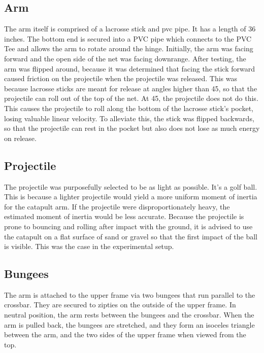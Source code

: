 \documentclass[10pt]{article}
\begin{document}
\begin{flushleft}
  \subsection{Arm}
    \par
    The arm itself is comprised of a lacrosse stick and pvc pipe.
    It has a length of 36 inches.
    The bottom end is secured into a PVC pipe which connects to the PVC Tee and allows the arm to rotate around the hinge.
    Initially, the arm was facing forward and the open side of the net was facing downrange.
    After testing, the arm was flipped around, because it was determined that facing the stick forward caused friction on the projectile when the projectile was released. 
    This was because lacrosse sticks are meant for release at angles higher than 45\textdegree, so that the projectile can roll out of the top of the net.
    At 45\textdegree, the projectile does not do this. 
    This causes the projectile to roll along the bottom of the lacrosse stick's pocket, losing valuable linear velocity.
    To alleviate this, the stick was flipped backwards, so that the projectile can rest in the pocket but also does not lose as much energy on release.

  \subsection{Projectile}
    \par
    The projectile was purposefully selected to be as light as possible. 
    It's a golf ball. 
    This is because a lighter projectile would yield a more uniform moment of inertia for the catapult arm.
    If the projectile were disproportionately heavy, the estimated moment of inertia would be less accurate.
    Because the projectile is prone to bouncing and rolling after impact with the ground, it is advised to use the catapult on a flat surface of sand or gravel so that the first impact of the ball is visible. This was the case in the experimental setup.

  \subsection{Bungees}
    \par
    The arm is attached to the upper frame via two bungees that run parallel to the crossbar.
    They are secured to zipties on the outside of the upper frame.
    In neutral position, the arm rests between the bungees and the crossbar.
    When the arm is pulled back, the bungees are stretched, and they form an isoceles triangle between the arm, and the two sides of the upper frame when viewed from the top. 


\end{flushleft}
\end{document}
